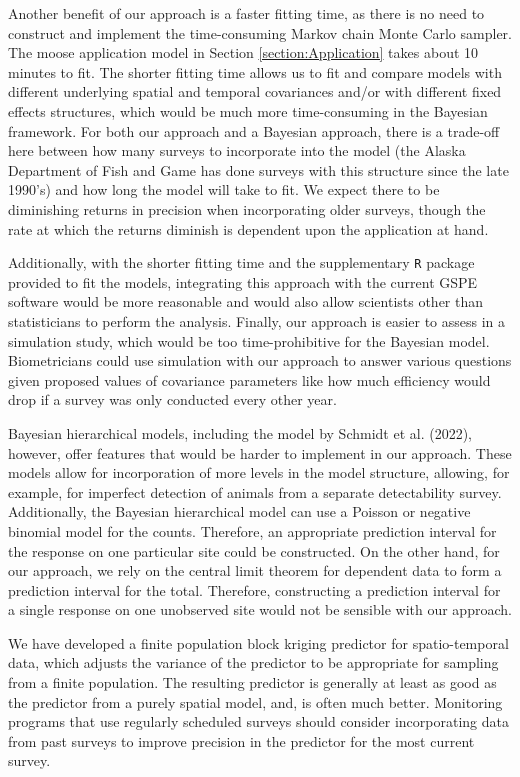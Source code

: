 \documentclass[smallextended]{svjour3}       %
\begin{document}
Another benefit of our approach is a faster fitting time, as there is no
need to construct and implement the time-consuming Markov chain Monte
Carlo sampler. The moose application model in Section
\ref{section:Application} takes about 10 minutes to fit. The shorter
fitting time allows us to fit and compare models with different
underlying spatial and temporal covariances and/or with different fixed
effects structures, which would be much more time-consuming in the
Bayesian framework. For both our approach and a Bayesian approach, there
is a trade-off here between how many surveys to incorporate into the
model (the Alaska Department of Fish and Game has done surveys with this
structure since the late 1990's) and how long the model will take to
fit. We expect there to be diminishing returns in precision when
incorporating older surveys, though the rate at which the returns
diminish is dependent upon the application at hand.

Additionally, with the shorter fitting time and the supplementary
\texttt{R} package provided to fit the models, integrating this approach
with the current GSPE software would be more reasonable and would also
allow scientists other than statisticians to perform the analysis.
Finally, our approach is easier to assess in a simulation study, which
would be too time-prohibitive for the Bayesian model. Biometricians
could use simulation with our approach to answer various questions given
proposed values of covariance parameters like how much efficiency would
drop if a survey was only conducted every other year.

Bayesian hierarchical models, including the model by Schmidt et al.
(2022), however, offer features that would be harder to implement in our
approach. These models allow for incorporation of more levels in the
model structure, allowing, for example, for imperfect detection of
animals from a separate detectability survey. Additionally, the Bayesian
hierarchical model can use a Poisson or negative binomial model for the
counts. Therefore, an appropriate prediction interval for the response
on one particular site could be constructed. On the other hand, for our
approach, we rely on the central limit theorem for dependent data to
form a prediction interval for the total. Therefore, constructing a
prediction interval for a single response on one unobserved site would
not be sensible with our approach.

We have developed a finite population block kriging predictor for
spatio-temporal data, which adjusts the variance of the predictor to be
appropriate for sampling from a finite population. The resulting
predictor is generally at least as good as the predictor from a purely
spatial model, and, is often much better. Monitoring programs that use
regularly scheduled surveys should consider incorporating data from past
surveys to improve precision in the predictor for the most current
survey.
\end{document}
